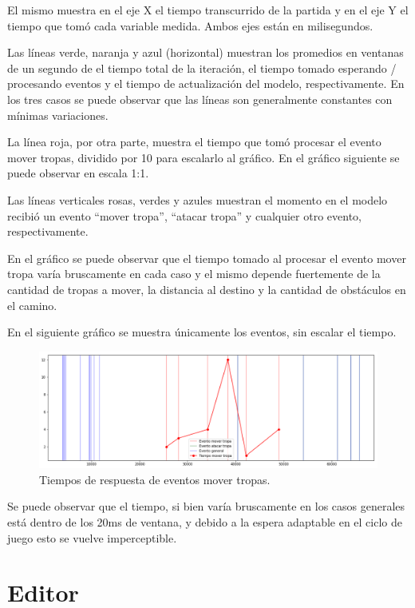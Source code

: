 \documentclass[titlepage,a4paper,12pt]{article}
\begin{document}
El mismo muestra en el eje X el tiempo transcurrido de la partida y en el eje Y el tiempo que tomó cada variable medida. Ambos ejes están en milisegundos.

Las líneas verde, naranja y azul (horizontal) muestran los promedios en ventanas de un segundo de el tiempo total de la iteración, el tiempo tomado esperando / procesando eventos y el tiempo de actualización del modelo, respectivamente. En los tres casos se puede observar que las líneas son generalmente constantes con mínimas variaciones.

La línea roja, por otra parte, muestra el tiempo que tomó procesar el evento mover tropas, dividido por 10 para escalarlo al gráfico. En el gráfico siguiente se puede observar en escala 1:1.

Las líneas verticales rosas, verdes y azules muestran el momento en el modelo recibió un evento ``mover tropa'', ``atacar tropa'' y cualquier otro evento, respectivamente.


En el gráfico se puede observar que el tiempo tomado al procesar el evento mover tropa varía bruscamente en cada caso y el mismo depende fuertemente de la cantidad de tropas a mover, la distancia al destino y la cantidad de obstáculos en el camino.

En el siguiente gráfico se muestra únicamente los eventos, sin escalar el tiempo. 

\begin{figure}[H]
	\centering
	\includegraphics[width=16cm]{../imagenes/analisis-tiempos-2.png}
	\caption{\label{fig:tiempos-ciclo-juego-2} Tiempos de respuesta de eventos mover tropas.}
\end{figure}

Se puede observar que el tiempo, si bien varía bruscamente en los casos generales está dentro de los 20ms de ventana, y debido a la espera adaptable en el ciclo de juego esto se vuelve imperceptible.

\newpage
\section{Editor}
\end{document}
